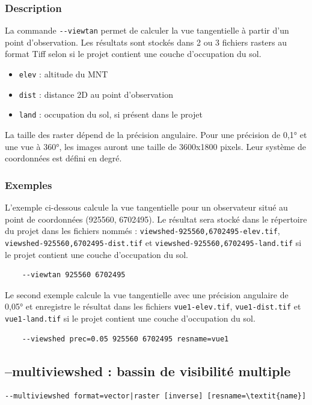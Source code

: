 \documentclass{report}
\begin{document}
\subsubsection{Description}
La commande \verb|--viewtan| permet de calculer la vue tangentielle à partir d'un point d'observation. Les résultats sont stockés dans 2 ou 3 fichiers rasters au format Tiff selon si le projet contient une couche d'occupation du sol. 
\begin{itemize}
	\item \verb|elev| : altitude du MNT
	\item \verb|dist| : distance 2D au point d'observation
	\item \verb|land| : occupation du sol, si présent dans le projet
\end{itemize}

La taille des raster dépend de la précision angulaire. Pour une précision de 0,1° et une vue à 360°, les images auront une taille de 3600x1800 pixels. Leur système de coordonnées est défini en degré. 

\subsubsection{Exemples}
L'exemple ci-dessous calcule la vue tangentielle pour un observateur situé au point de coordonnées (925560, 6702495). Le résultat sera stocké dans le répertoire du projet dans les fichiers nommés : \verb|viewshed-925560,6702495-elev.tif|, \verb|viewshed-925560,6702495-dist.tif| et \verb|viewshed-925560,6702495-land.tif| si le projet contient une couche d'occupation du sol.
\begin{Verbatim}
	--viewtan 925560 6702495
\end{Verbatim}

Le second exemple calcule la vue tangentielle avec une précision angulaire de 0,05° et enregistre le résultat dans les fichiers \verb|vue1-elev.tif|, \verb|vue1-dist.tif| et \verb|vue1-land.tif| si le projet contient une couche d'occupation du sol.
\begin{Verbatim}
	--viewshed prec=0.05 925560 6702495 resname=vue1
\end{Verbatim}


\subsection{--multiviewshed : bassin de visibilité multiple}
\begin{Verbatim}[commandchars=\\\{\}]
--multiviewshed format=vector|raster [inverse] [resname=\textit{name}]
\end{Verbatim}
\end{document}
